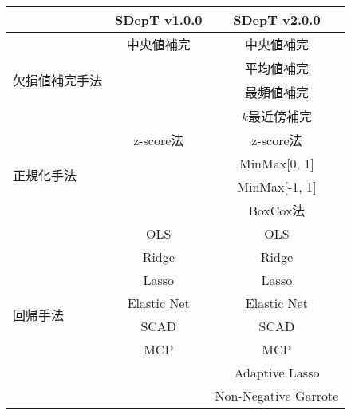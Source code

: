 \begin{table}[h]
  \centering
  \captionsetup{labelformat=empty} %
  \caption{}
  \label{table:Comparison}
    \begin{tabular}{|l|c|c|}
      \hline
      ~ & SDepT v1.0.0 & SDepT v2.0.0 \\ \hline
      \multirow{4}{*}{欠損値補完手法} & 中央値補完 & 中央値補完 \\
       & & 平均値補完 \\
       & & 最頻値補完 \\
       & & $k$最近傍補完 \\ \hline
      \multirow{4}{*}{正規化手法} & z-score法 & z-score法 \\
       & & MinMax[0, 1] \\
       & & MinMax[-1, 1] \\
       & & BoxCox法 \\ \hline
      \multirow{8}{*}{回帰手法} & OLS & OLS \\
       & Ridge & Ridge \\
       & Lasso & Lasso \\
       & Elastic Net & Elastic Net \\
       & SCAD & SCAD \\
       & MCP & MCP \\
       & & Adaptive Lasso \\
       & & Non-Negative Garrote \\ \hline
    \end{tabular}
\end{table}